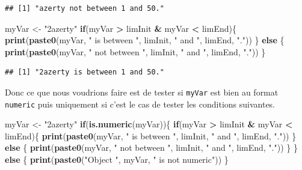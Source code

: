 \documentclass[
]{book}
\newenvironment{Shaded}{\begin{snugshade}}{\end{snugshade}}
\newcommand{\ControlFlowTok}[1]{\textcolor[rgb]{0.13,0.29,0.53}{\textbf{#1}}}
\newcommand{\KeywordTok}[1]{\textcolor[rgb]{0.13,0.29,0.53}{\textbf{#1}}}
\newcommand{\NormalTok}[1]{#1}
\newcommand{\OperatorTok}[1]{\textcolor[rgb]{0.81,0.36,0.00}{\textbf{#1}}}
\newcommand{\StringTok}[1]{\textcolor[rgb]{0.31,0.60,0.02}{#1}}
\begin{document}
\begin{verbatim}
## [1] "azerty not between 1 and 50."
\end{verbatim}

\begin{Shaded}
\begin{Highlighting}[]
\NormalTok{myVar <-}\StringTok{ "2azerty"}
\ControlFlowTok{if}\NormalTok{(myVar }\OperatorTok{>}\StringTok{ }\NormalTok{limInit }\OperatorTok{&}\StringTok{ }\NormalTok{myVar }\OperatorTok{<}\StringTok{ }\NormalTok{limEnd)\{}
  \KeywordTok{print}\NormalTok{(}\KeywordTok{paste0}\NormalTok{(myVar, }\StringTok{" is between "}\NormalTok{, limInit, }\StringTok{" and "}\NormalTok{, limEnd, }\StringTok{"."}\NormalTok{))}
\NormalTok{\} }\ControlFlowTok{else}\NormalTok{ \{}
  \KeywordTok{print}\NormalTok{(}\KeywordTok{paste0}\NormalTok{(myVar, }\StringTok{" not between "}\NormalTok{, limInit, }\StringTok{" and "}\NormalTok{, limEnd, }\StringTok{"."}\NormalTok{))}
\NormalTok{\}}
\end{Highlighting}
\end{Shaded}

\begin{verbatim}
## [1] "2azerty is between 1 and 50."
\end{verbatim}

Donc ce que nous voudrions faire est de tester si \texttt{myVar} est bien au format \texttt{numeric} puis uniquement si c'est le cas de tester les conditions suivantes.

\begin{Shaded}
\begin{Highlighting}[]
\NormalTok{myVar <-}\StringTok{ "2azerty"}
\ControlFlowTok{if}\NormalTok{(}\KeywordTok{is.numeric}\NormalTok{(myVar))\{}
  \ControlFlowTok{if}\NormalTok{(myVar }\OperatorTok{>}\StringTok{ }\NormalTok{limInit }\OperatorTok{&}\StringTok{ }\NormalTok{myVar }\OperatorTok{<}\StringTok{ }\NormalTok{limEnd)\{}
    \KeywordTok{print}\NormalTok{(}\KeywordTok{paste0}\NormalTok{(myVar, }\StringTok{" is between "}\NormalTok{, limInit, }\StringTok{" and "}\NormalTok{, limEnd, }\StringTok{"."}\NormalTok{))}
\NormalTok{  \} }\ControlFlowTok{else}\NormalTok{ \{}
    \KeywordTok{print}\NormalTok{(}\KeywordTok{paste0}\NormalTok{(myVar, }\StringTok{" not between "}\NormalTok{, limInit, }\StringTok{" and "}\NormalTok{, limEnd, }\StringTok{"."}\NormalTok{))}
\NormalTok{  \}}
\NormalTok{\} }\ControlFlowTok{else}\NormalTok{ \{}
  \KeywordTok{print}\NormalTok{(}\KeywordTok{paste0}\NormalTok{(}\StringTok{"Object "}\NormalTok{, myVar, }\StringTok{" is not numeric"}\NormalTok{))}
\NormalTok{\}}
\end{Highlighting}
\end{Shaded}
\end{document}
